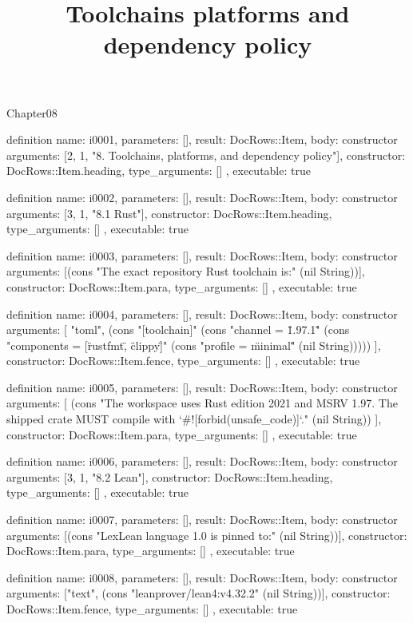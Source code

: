 \begin{lexlean}{Chapter08}
\title{Toolchains platforms and dependency policy}
\begin{semanticmodule}
definition{
  name: i0001,
  parameters: [],
  result: DocRows::Item,
  body: constructor{
    arguments: [2, 1, "8. Toolchains, platforms, and dependency policy"],
    constructor: DocRows::Item.heading,
    type_arguments: []
  },
  executable: true
}

definition{
  name: i0002,
  parameters: [],
  result: DocRows::Item,
  body: constructor{
    arguments: [3, 1, "8.1 Rust"],
    constructor: DocRows::Item.heading,
    type_arguments: []
  },
  executable: true
}

definition{
  name: i0003,
  parameters: [],
  result: DocRows::Item,
  body: constructor{
    arguments: [(cons "The exact repository Rust toolchain is:" (nil String))],
    constructor: DocRows::Item.para,
    type_arguments: []
  },
  executable: true
}

definition{
  name: i0004,
  parameters: [],
  result: DocRows::Item,
  body: constructor{
    arguments: [
      "toml",
      (cons "[toolchain]" (cons "channel = \"1.97.1\"" (cons "components = [\"rustfmt\", \"clippy\"]" (cons "profile = \"minimal\"" (nil String)))))
    ],
    constructor: DocRows::Item.fence,
    type_arguments: []
  },
  executable: true
}

definition{
  name: i0005,
  parameters: [],
  result: DocRows::Item,
  body: constructor{
    arguments: [
      (cons "The workspace uses Rust edition 2021 and MSRV 1.97. The shipped crate MUST compile with `#![forbid(unsafe_code)]`." (nil String))
    ],
    constructor: DocRows::Item.para,
    type_arguments: []
  },
  executable: true
}

definition{
  name: i0006,
  parameters: [],
  result: DocRows::Item,
  body: constructor{
    arguments: [3, 1, "8.2 Lean"],
    constructor: DocRows::Item.heading,
    type_arguments: []
  },
  executable: true
}

definition{
  name: i0007,
  parameters: [],
  result: DocRows::Item,
  body: constructor{
    arguments: [(cons "LexLean language 1.0 is pinned to:" (nil String))],
    constructor: DocRows::Item.para,
    type_arguments: []
  },
  executable: true
}

definition{
  name: i0008,
  parameters: [],
  result: DocRows::Item,
  body: constructor{
    arguments: ["text", (cons "leanprover/lean4:v4.32.2" (nil String))],
    constructor: DocRows::Item.fence,
    type_arguments: []
  },
  executable: true
}


\end{semanticmodule}
\end{lexlean}

